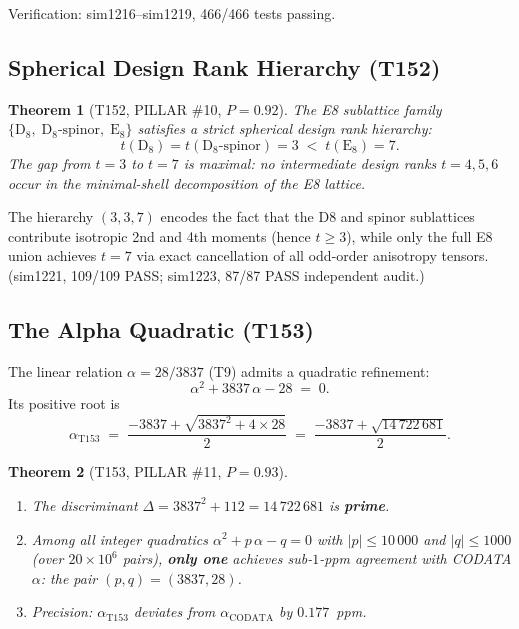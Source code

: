 \documentclass[aps,prd,twocolumn,superscriptaddress,floatfix,nofootinbib]{revtex4-2}
\newtheorem{theorem}{Theorem}
\theoremstyle{definition}
\theoremstyle{remark}
\begin{document}
\noindent
Verification: sim1216--sim1219, 466/466 tests passing.

\subsection{Spherical Design Rank Hierarchy (T152)}
\label{sec:design-hierarchy}

\begin{theorem}[T152, PILLAR \#10, $P{=}0.92$]
The E8 sublattice family $\{\mathrm{D}_8,\;
\mathrm{D}_8\text{-spinor},\; \mathrm{E}_8\}$ satisfies a strict
spherical design rank hierarchy:
\begin{equation}
  t(\mathrm{D}_8) = t(\mathrm{D}_8\text{-spinor}) = 3
  \;<\; t(\mathrm{E}_8) = 7.
  \label{eq:design-hierarchy}
\end{equation}
The gap from $t{=}3$ to $t{=}7$ is maximal: no intermediate
design ranks $t{=}4,5,6$ occur in the minimal-shell
decomposition of the E8 lattice.
\end{theorem}

\noindent
The hierarchy $(3,3,7)$ encodes the fact that the D8 and
spinor sublattices contribute isotropic 2nd and 4th moments (hence
$t \ge 3$), while only the full E8 union achieves $t = 7$ via exact
cancellation of all odd-order anisotropy tensors.  (sim1221, 109/109
PASS; sim1223, 87/87 PASS independent audit.)

\subsection{The Alpha Quadratic (T153)}
\label{sec:alpha-quadratic}

The linear relation $\alpha = 28/3837$ (T9) admits a quadratic
refinement:
\begin{equation}
  \alpha^2 + 3837\,\alpha - 28 \;=\; 0.
  \label{eq:alpha-quadratic}
\end{equation}
Its positive root is
\begin{equation}
  \alpha_{\mathrm{T153}} \;=\;
    \frac{-3837 + \sqrt{3837^2 + 4 \times 28}}{2}
    \;=\; \frac{-3837 + \sqrt{14\,722\,681}}{2}.
  \label{eq:alpha-T153-root}
\end{equation}

\begin{theorem}[T153, PILLAR \#11, $P{=}0.93$]
\leavevmode
\begin{enumerate}
  \item The discriminant $\Delta = 3837^2 + 112 = 14\,722\,681$ is
        \textbf{prime}.
  \item Among all integer quadratics $\alpha^2 + p\,\alpha - q = 0$ with
        $|p| \le 10\,000$ and $|q| \le 1000$ (over $20 \times 10^6$
        pairs), \textbf{only one} achieves sub-$1$-ppm agreement with
        CODATA $\alpha$: the pair $(p,q) = (3837,28)$.
  \item Precision: $\alpha_{\mathrm{T153}}$ deviates from
        $\alpha_{\mathrm{CODATA}}$ by $0.177$~ppm.
\end{enumerate}
\end{theorem}
\end{document}
